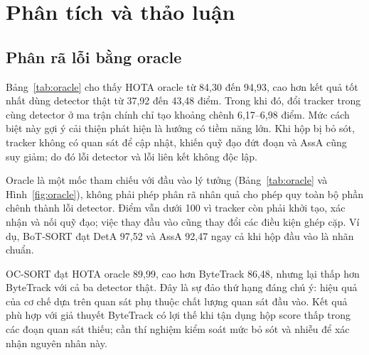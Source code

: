 \documentclass[fontsize=13pt,a4paper,oneside,parskip=false,numbers=noenddot,bibliography=totoc]{scrreprt}
\begin{document}
\section{Phân tích và thảo luận}
\label{sec:phan-tich}

\subsection{Phân rã lỗi bằng oracle}
\label{sec:oracle}

Bảng~\ref{tab:oracle} cho thấy HOTA oracle từ 84,30 đến 94,93, cao hơn kết quả tốt nhất dùng detector thật từ 37,92 đến 43,48 điểm. Trong khi đó, đổi tracker trong cùng detector ở ma trận chính chỉ tạo khoảng chênh 6,17--6,98 điểm. Mức cách biệt này gợi ý cải thiện phát hiện là hướng có tiềm năng lớn. Khi hộp bị bỏ sót, tracker không có quan sát để cập nhật, khiến quỹ đạo đứt đoạn và AssA cũng suy giảm; do đó lỗi detector và lỗi liên kết không độc lập.

Oracle là một mốc tham chiếu với đầu vào lý tưởng (Bảng~\ref{tab:oracle} và Hình~\ref{fig:oracle}), không phải phép phân rã nhân quả cho phép quy toàn bộ phần chênh thành lỗi detector. Điểm vẫn dưới 100 vì tracker còn phải khởi tạo, xác nhận và nối quỹ đạo; việc thay đầu vào cũng thay đổi các điều kiện ghép cặp. Ví dụ, BoT-SORT đạt DetA 97,52 và AssA 92,47 ngay cả khi hộp đầu vào là nhãn chuẩn.

OC-SORT đạt HOTA oracle 89,99, cao hơn ByteTrack 86,48, nhưng lại thấp hơn ByteTrack với cả ba detector thật. Đây là sự đảo thứ hạng đáng chú ý: hiệu quả của cơ chế dựa trên quan sát phụ thuộc chất lượng quan sát đầu vào. Kết quả phù hợp với giả thuyết ByteTrack có lợi thế khi tận dụng hộp score thấp trong các đoạn quan sát thiếu; cần thí nghiệm kiểm soát mức bỏ sót và nhiễu để xác nhận nguyên nhân này.
\end{document}
